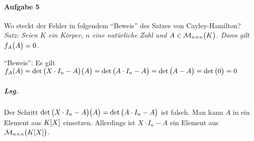 \documentclass{scrreprt}
\begin{document}
\paragraph{Aufgabe 5} Wo steckt der Fehler in folgendem ``Beweis'' des Satzes von
Cayley-Hamilton?
\emph{Satz: Seien $K$ ein Körper, $n$ eine natürliche Zahl und
  $A \in \mathcal{M}_{n \times n}\qty\big(K)$.
  Dann gilt $f_A\qty\big(A) = 0$.}

\noindent
``Beweis'': Es gilt $f_A(A) = \det\qty\big(X \cdot I_n - A)\qty\big(A)
= \det\qty\big(A \cdot I_n - A) = \det\qty\big(A - A) = \det\qty\big(0) = 0$

\subparagraph{Lsg.} Der Schritt $\det\qty\big(X \cdot I_n - A)\qty\big(A)
= \det\qty\big(A \cdot I_n - A)$ ist falsch.
Man kann $A$ in ein Element aus $K\qty[X]$ einsetzen.
Allerdings ist $X \cdot I_n - A$ ein Element aus
$\mathcal{M}_{n \times n}\qty\big(K\qty[X])$.
\end{document}
